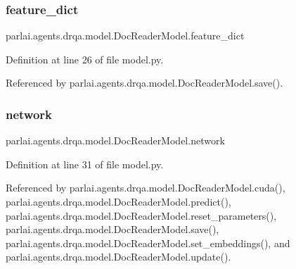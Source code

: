 \subsubsection{\texorpdfstring{feature\+\_\+dict}{feature\_dict}}
{\footnotesize\ttfamily parlai.\+agents.\+drqa.\+model.\+Doc\+Reader\+Model.\+feature\+\_\+dict}



Definition at line 26 of file model.\+py.



Referenced by parlai.\+agents.\+drqa.\+model.\+Doc\+Reader\+Model.\+save().

\mbox{\label{classparlai_1_1agents_1_1drqa_1_1model_1_1DocReaderModel_a2c06172550232ff17fa3b6538c1b3d55}} 
\subsubsection{\texorpdfstring{network}{network}}
{\footnotesize\ttfamily parlai.\+agents.\+drqa.\+model.\+Doc\+Reader\+Model.\+network}



Definition at line 31 of file model.\+py.



Referenced by parlai.\+agents.\+drqa.\+model.\+Doc\+Reader\+Model.\+cuda(), parlai.\+agents.\+drqa.\+model.\+Doc\+Reader\+Model.\+predict(), parlai.\+agents.\+drqa.\+model.\+Doc\+Reader\+Model.\+reset\+\_\+parameters(), parlai.\+agents.\+drqa.\+model.\+Doc\+Reader\+Model.\+save(), parlai.\+agents.\+drqa.\+model.\+Doc\+Reader\+Model.\+set\+\_\+embeddings(), and parlai.\+agents.\+drqa.\+model.\+Doc\+Reader\+Model.\+update().

\mbox{\label{classparlai_1_1agents_1_1drqa_1_1model_1_1DocReaderModel_ae6b1a15378e076ef66f15bf4183f8d69}} 
